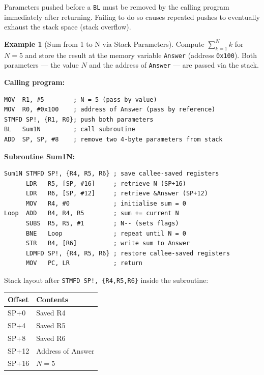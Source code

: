 \documentclass[11pt, a4paper, notitlepage]{report}
\theoremstyle{definition}
\theoremstyle{remark}
\theoremstyle{definition}
\newtheorem{example}[theorem]{Example}
\begin{document}
\begin{warning}[title={Stack Cleanup is the Caller's Responsibility}]
Parameters pushed before a \texttt{BL} must be removed by the calling program immediately after returning. Failing to do so causes repeated pushes to eventually exhaust the stack space (stack overflow).
\end{warning}

\begin{example}[Sum from 1 to N via Stack Parameters]
Compute $\sum_{k=1}^{N} k$ for $N = 5$ and store the result at the memory variable \texttt{Answer} (address \texttt{0x100}). Both parameters --- the value $N$ and the address of \texttt{Answer} --- are passed via the stack.

\textbf{Calling program:}
\begin{lstlisting}
MOV  R1, #5        ; N = 5 (pass by value)
MOV  R0, #0x100    ; address of Answer (pass by reference)
STMFD SP!, {R1, R0}; push both parameters
BL   Sum1N         ; call subroutine
ADD  SP, SP, #8    ; remove two 4-byte parameters from stack
\end{lstlisting}

\textbf{Subroutine Sum1N:}
\begin{lstlisting}
Sum1N STMFD SP!, {R4, R5, R6} ; save callee-saved registers
      LDR   R5, [SP, #16]     ; retrieve N (SP+16)
      LDR   R6, [SP, #12]     ; retrieve &Answer (SP+12)
      MOV   R4, #0            ; initialise sum = 0
Loop  ADD   R4, R4, R5        ; sum += current N
      SUBS  R5, R5, #1        ; N-- (sets flags)
      BNE   Loop              ; repeat until N = 0
      STR   R4, [R6]          ; write sum to Answer
      LDMFD SP!, {R4, R5, R6} ; restore callee-saved registers
      MOV   PC, LR            ; return
\end{lstlisting}

Stack layout after \texttt{STMFD SP!, \{R4,R5,R6\}} inside the subroutine:

\begin{center}
\begin{tabular}{ll}
\toprule
\textbf{Offset} & \textbf{Contents} \\
\midrule
SP+0 & Saved R4 \\
SP+4 & Saved R5 \\
SP+8 & Saved R6 \\
SP+12 & Address of Answer \\
SP+16 & $N = 5$ \\
\bottomrule
\end{tabular}
\end{center}
\end{example}
\end{document}
